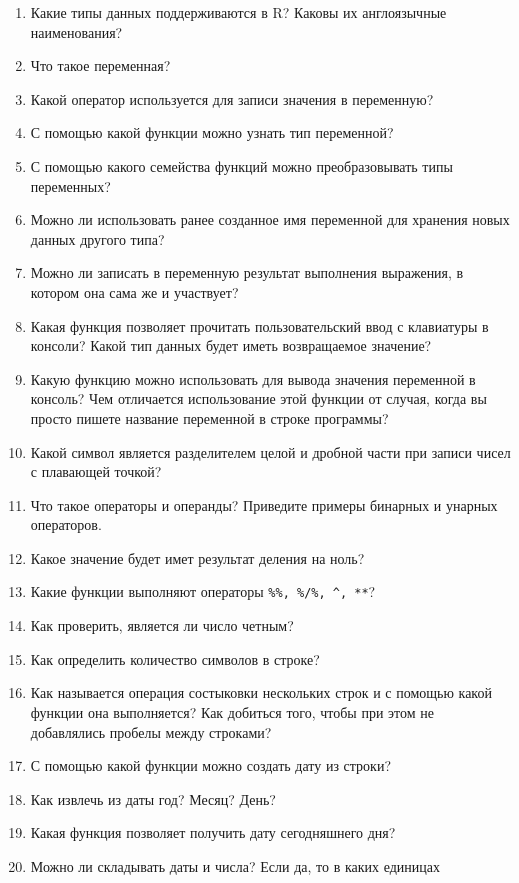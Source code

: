 \documentclass[]{book}
\providecommand{\tightlist}{%
  \setlength{\itemsep}{0pt}\setlength{\parskip}{0pt}}
\begin{document}
\begin{enumerate}
\def\labelenumi{\arabic{enumi}.}
\tightlist
\item
  Какие типы данных поддерживаются в R? Каковы их англоязычные
  наименования?
\item
  Что такое переменная?
\item
  Какой оператор используется для записи значения в переменную?
\item
  С помощью какой функции можно узнать тип переменной?
\item
  С помощью какого семейства функций можно преобразовывать типы
  переменных?
\item
  Можно ли использовать ранее созданное имя переменной для хранения
  новых данных другого типа?
\item
  Можно ли записать в переменную результат выполнения выражения, в
  котором она сама же и участвует?
\item
  Какая функция позволяет прочитать пользовательский ввод с клавиатуры в
  консоли? Какой тип данных будет иметь возвращаемое значение?
\item
  Какую функцию можно использовать для вывода значения переменной в
  консоль? Чем отличается использование этой функции от случая, когда вы
  просто пишете название переменной в строке программы?
\item
  Какой символ является разделителем целой и дробной части при записи
  чисел с плавающей точкой?
\item
  Что такое операторы и операнды? Приведите примеры бинарных и унарных
  операторов.
\item
  Какое значение будет имет результат деления на ноль?
\item
  Какие функции выполняют операторы \texttt{\%\%,\ \%/\%,\ \^{},\ **}?
\item
  Как проверить, является ли число четным?
\item
  Как определить количество символов в строке?
\item
  Как называется операция состыковки нескольких строк и с помощью какой
  функции она выполняется? Как добиться того, чтобы при этом не
  добавлялись пробелы между строками?
\item
  С помощью какой функции можно создать дату из строки?
\item
  Как извлечь из даты год? Месяц? День?
\item
  Какая функция позволяет получить дату сегодняшнего дня?
\item
  Можно ли складывать даты и числа? Если да, то в каких единицах

\end{enumerate}
\end{document}
